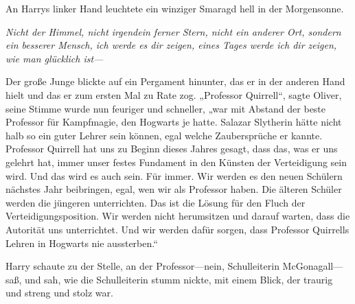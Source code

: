 An Harrys linker Hand leuchtete ein winziger Smaragd hell in der Morgensonne.

\emph{Nicht der Himmel, nicht irgendein ferner Stern, nicht ein anderer Ort, sondern ein besserer Mensch, ich werde es dir zeigen, eines Tages werde ich dir zeigen, wie man glücklich ist—}

Der große Junge blickte auf ein Pergament hinunter, das er in der anderen Hand hielt und das er zum ersten Mal zu Rate zog.
„Professor Quirrell“, sagte Oliver, seine Stimme wurde nun feuriger und schneller, „war mit Abstand der beste Professor für Kampfmagie, den Hogwarts je hatte. Salazar Slytherin hätte nicht halb so ein guter Lehrer sein können, egal welche Zaubersprüche er kannte. Professor Quirrell hat uns zu Beginn dieses Jahres gesagt, dass das, was er uns gelehrt hat, immer unser festes Fundament in den Künsten der Verteidigung sein wird. Und das wird es auch sein. Für immer. Wir werden es den neuen Schülern nächstes Jahr beibringen, egal, wen wir als Professor haben. Die älteren Schüler werden die jüngeren unterrichten. Das ist die Lösung für den Fluch der Verteidigungsposition. Wir werden nicht herumsitzen und darauf warten, dass die Autorität uns unterrichtet. Und wir werden dafür sorgen, dass Professor Quirrells Lehren in Hogwarts nie aussterben.“

Harry schaute zu der Stelle, an der Professor—nein, Schulleiterin McGonagall—saß, und sah, wie die Schulleiterin stumm nickte, mit einem Blick, der traurig und streng und stolz war.

